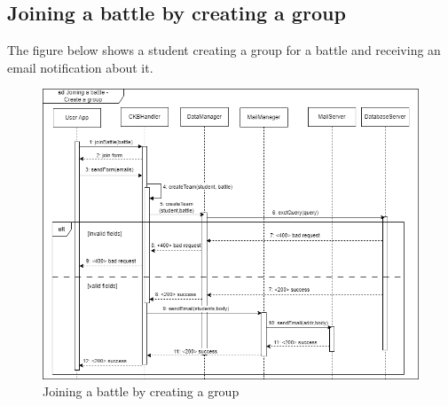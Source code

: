 \subsection{Joining a battle by creating a group}
The figure below shows a student creating a group for a battle and receiving an email notification about it.\\
\begin{figure}[H]
    \centering
    \includegraphics[width=1\textwidth]{images/seq_diagrams/joining_battle_create_group_DD.png}
    \caption{Joining a battle by creating a group}
\end{figure}

